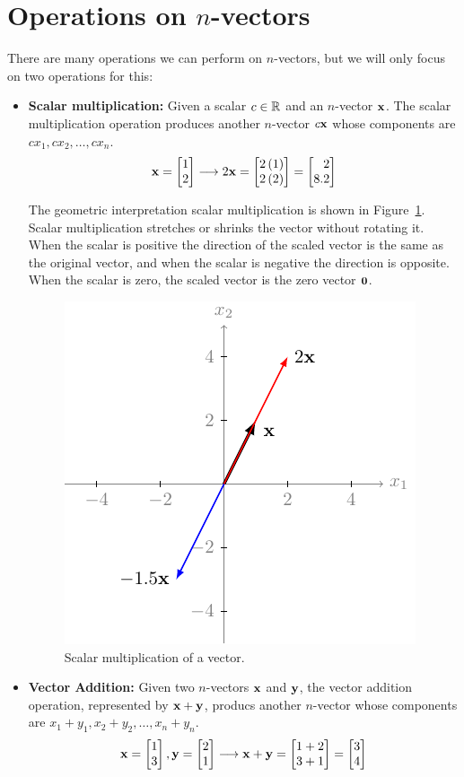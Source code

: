 \section{Operations on $n$-vectors}
There are many operations we can perform on $n$-vectors, but we will only focus on two operations for this:
\begin{itemize}
    \item \textbf{Scalar multiplication:} Given a scalar $c \in \mathbb{R}$ and an $n$-vector $\mathbf{x}$. The scalar multiplication operation produces another $n$-vector $c\mathbf{x}$ whose components are $cx_1, cx_2, \ldots, cx_n$. 
    \[ \mf{x} = \bmx 1 \\ 2\emx \longrightarrow 2 \mf{x} = \bmx  2\ct{1} \\ 2\ct{2} \emx = \bmx  2 \\ 8.2 \emx \]

    The geometric interpretation scalar multiplication is shown in Figure~\ref{fig:scalar-mult}. Scalar multiplication stretches or shrinks the vector without rotating it. When the scalar is positive the direction of the scaled vector is the same as the original vector, and when the scalar is negative the direction is opposite. When the scalar is zero, the scaled vector is the zero vector $\mathbf{0}$. 
    \begin{figure}[h!]
        \centering
        \includegraphics{figure/chapter01/vec-scale.pdf}
        \caption{Scalar multiplication of a vector.}
        \label{fig:scalar-mult}
    \end{figure}
    
    \item \textbf{Vector Addition:} Given two $n$-vectors $\mathbf{x}$ and $\mathbf{y}$, the vector addition operation, represented by $\mathbf{x} + \mathbf{y}$, producs another $n$-vector whose components are $x_1 + y_1, x_2 + y_2, \ldots, x_n + y_n$.
    \[ \mf{x} = \bmxc 1 \\ 3 \emx, \mf{y} = \bmxc 2 \\ 1 \emx \longrightarrow \mf{x} + \mf{y} = \bmxc 1 + 2 \\ 3 + 1 \emx = \bmxc 3 \\ 4 \emx \]
    

\end{itemize}
